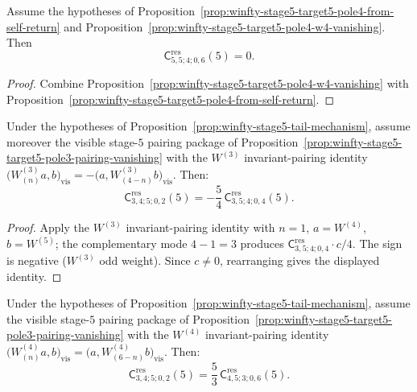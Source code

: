 \begin{corollary}
\label{cor:winfty-stage5-self-return-vanishing-on-pairing}
Assume the hypotheses of
Proposition~\ref{prop:winfty-stage5-target5-pole4-from-self-return}
and Proposition~\ref{prop:winfty-stage5-target5-pole4-w4-vanishing}.
Then
\[
\mathsf{C}^{\mathrm{res}}_{5,5;4;0,6}(5)=0.
\]
\end{corollary}

\begin{proof}
Combine Proposition~\ref{prop:winfty-stage5-target5-pole4-w4-vanishing} with
Proposition~\ref{prop:winfty-stage5-target5-pole4-from-self-return}.
\end{proof}

\begin{proposition}
\label{prop:winfty-stage5-tail-from-w3-pairing}
Under the hypotheses of
Proposition~\ref{prop:winfty-stage5-tail-mechanism}, assume moreover
the visible stage-$5$ pairing package of
Proposition~\ref{prop:winfty-stage5-target5-pole3-pairing-vanishing}
with the $W^{(3)}$ invariant-pairing identity
$\bigl(W^{(3)}_{(n)}a,b\bigr)_{\mathrm{vis}}
=-\bigl(a,W^{(3)}_{(4-n)}b\bigr)_{\mathrm{vis}}$.
Then:
\[
\mathsf{C}^{\mathrm{res}}_{3,4;5;0,2}(5)
=
-\frac{5}{4}\,
\mathsf{C}^{\mathrm{res}}_{3,5;4;0,4}(5).
\]
\end{proposition}

\begin{proof}
Apply the $W^{(3)}$ invariant-pairing identity with \(n=1\), \(a=W^{(4)}\), \(b=W^{(5)}\); the complementary mode \(4-1=3\) produces \(\mathsf{C}^{\mathrm{res}}_{3,5;4;0,4}\cdot c/4\).  The sign is negative (\(W^{(3)}\) odd weight).  Since \(c\neq 0\), rearranging gives the displayed identity.
\end{proof}

\begin{proposition}
\label{prop:winfty-stage5-tail-from-w4-pairing}
Under the hypotheses of
Proposition~\ref{prop:winfty-stage5-tail-mechanism}, assume the visible stage-$5$ pairing package of
Proposition~\ref{prop:winfty-stage5-target5-pole3-pairing-vanishing}
with the $W^{(4)}$ invariant-pairing identity
$\bigl(W^{(4)}_{(n)}a,b\bigr)_{\mathrm{vis}}
=\bigl(a,W^{(4)}_{(6-n)}b\bigr)_{\mathrm{vis}}$.
Then:
\[
\mathsf{C}^{\mathrm{res}}_{3,4;5;0,2}(5)
=
\frac{5}{3}\,
\mathsf{C}^{\mathrm{res}}_{4,5;3;0,6}(5).
\]
\end{proposition}

